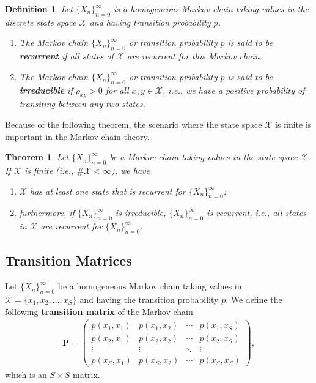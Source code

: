 \documentclass[11pt,letterpaper, leqno]{article}
\newtheorem{theorem}{Theorem}
\newtheorem{definition}{Definition}
\numberwithin{equation}{section}
\numberwithin{theorem}{section}
\numberwithin{lemma}{section}
\numberwithin{corollary}{section}
\numberwithin{definition}{section}
\numberwithin{proposition}{section}
\numberwithin{remark}{section}
\numberwithin{example}{section}
\begin{document}
\begin{definition}
Let $\{X_n\}_{n=0}^\infty$ is a homogeneous Markov chain taking values in the discrete state space $\mathcal{X}$ and having transition probability $p$.
\begin{enumerate}
    \item The Markov chain $\{X_n\}_{n=0}^\infty$ or transition probability $p$ is said to be \textbf{recurrent} if all states of $\mathcal{X}$ are recurrent for this Markov chain.
    \item The Markov chain $\{X_n\}_{n=0}^\infty$ or transition probability $p$ is said to be \textbf{irreducible} if $\rho_{xy}>0$ for all $x,y\in\mathcal{X}$, i.e., we have a positive probability of transiting between any two states.
\end{enumerate}
\end{definition}

Because of the following theorem, the scenario where the state space $\mathcal{X}$ is finite is important in the Markov chain theory.
\begin{theorem}\label{thm: a finite state chain must have a recurrent state}
Let $\{X_n\}_{n=0}^\infty$ be a Markov chain taking values in the state space $\mathcal{X}$. If $\mathcal{X}$ is finite (i.e., $\#\mathcal{X}<\infty$), we have
\begin{enumerate}
    \item $\mathcal{X}$ has at least one state that is recurrent for $\{X_n\}_{n=0}^\infty$;
    \item furthermore, if $\{X_n\}_{n=0}^\infty$ is irreducible, $\{X_n\}_{n=0}^\infty$ is recurrent, i.e., all states in $\mathcal{X}$ are recurrent for $\{X_n\}_{n=0}^\infty$.
\end{enumerate}
\end{theorem}


\subsection{Transition Matrices}

Let $\{X_n\}_{n=0}^\infty$ be a homogeneous Markov chain taking values in $\mathcal{X}=\{x_1,x_2,\ldots, x_S\}$ and having the transition probability $p$. We define the following \textbf{transition matrix} of the Markov chain
\begin{align}\label{eq: transition matrix}
    \boldsymbol{P}=
    \begin{pmatrix}
    p(x_1, x_1) & p(x_1, x_2) & \cdots & p(x_1, x_S) \\
    p(x_2, x_1) & p(x_2, x_2) & \cdots & p(x_2, x_S) \\
    \vdots & \vdots & \ddots & \vdots \\
    p(x_S, x_1) & p(x_S, x_2) & \cdots & p(x_S, x_S)
    \end{pmatrix},
\end{align}
which is an $S\times S$ matrix.
\end{document}

